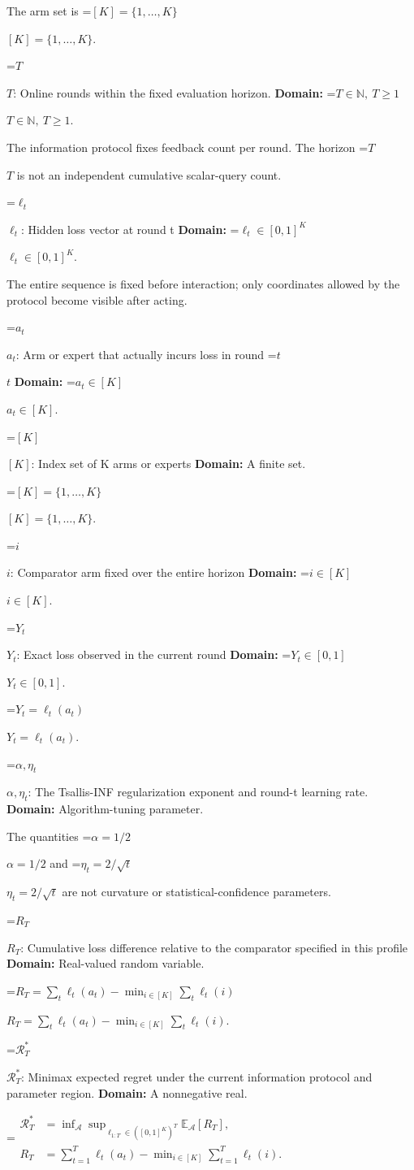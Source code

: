 \documentclass[10pt,a4paper]{article}
\newcommand{\AtlasMath}[1]{\par\begingroup\centering\setbox0=\hbox{$\displaystyle #1$}\ifdim\wd0>1.4\linewidth\typeout{ATLAS WIDE FORMULA: \the\wd0}\fi\ifdim\wd0>\linewidth\resizebox{\linewidth}{!}{\box0}\else\box0\fi\par\endgroup}
\newcommand{\AtlasInlineMath}[1]{\begingroup\setbox0=\hbox{$#1$}\ifdim\wd0>.4\linewidth\endgroup\AtlasMath{#1}\else\endgroup$#1$\fi}
\begin{document}
The arm set is \AtlasInlineMath{[K]=\{1,\ldots,K\}}.

\AtlasInlineMath{T}: Online rounds within the fixed evaluation horizon. \textbf{Domain:} \AtlasInlineMath{T\in\mathbb N,\ T\ge1}.

The information protocol fixes feedback count per round. The horizon \AtlasInlineMath{T} is not an independent cumulative scalar-query count.

\AtlasInlineMath{\ell_t}: Hidden loss vector at round t \textbf{Domain:} \AtlasInlineMath{\ell_t\in[0,1]^K}.

The entire sequence is fixed before interaction; only coordinates allowed by the protocol become visible after acting.

\AtlasInlineMath{a_t}: Arm or expert that actually incurs loss in round \AtlasInlineMath{t} \textbf{Domain:} \AtlasInlineMath{a_t\in[K]}.

\AtlasInlineMath{[K]}: Index set of K arms or experts \textbf{Domain:} A finite set.

\AtlasInlineMath{[K]=\{1,\ldots,K\}}.

\AtlasInlineMath{i}: Comparator arm fixed over the entire horizon \textbf{Domain:} \AtlasInlineMath{i\in[K]}.

\AtlasInlineMath{Y_t}: Exact loss observed in the current round \textbf{Domain:} \AtlasInlineMath{Y_t\in[0,1]}.

\AtlasInlineMath{Y_t=\ell_t(a_t)}.

\AtlasInlineMath{\alpha,\eta_t}: The Tsallis-INF regularization exponent and round-t learning rate. \textbf{Domain:} Algorithm-tuning parameter.

The quantities \AtlasInlineMath{\alpha=1/2} and \AtlasInlineMath{\eta_t=2/\sqrt t} are not curvature or statistical-confidence parameters.

\AtlasInlineMath{R_T}: Cumulative loss difference relative to the comparator specified in this profile \textbf{Domain:} Real-valued random variable.

\AtlasInlineMath{R_T=\sum_t\ell_t(a_t)-\min_{i\in[K]}\sum_t\ell_t(i)}.

\AtlasInlineMath{\mathcal R_T^*}: Minimax expected regret under the current information protocol and parameter region. \textbf{Domain:} A nonnegative real.


\AtlasMath{\begin{aligned}\mathcal R_T^*&=\inf_{\mathcal A}\sup_{\ell_{1:T}\in([0,1]^K)^T}\mathbb E_{\mathcal A}[R_T],\\ R_T&=\sum_{t=1}^T\ell_t(a_t)-\min_{i\in[K]}\sum_{t=1}^T\ell_t(i).\end{aligned}}
\end{document}
